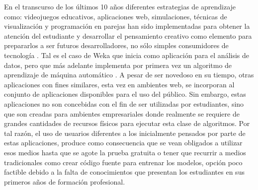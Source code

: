 En el transcurso de los últimos 10 años diferentes estrategias de aprendizaje como: videojuegos educativos, aplicaciones web, simulaciones, técnicas de visualización y programación en parejas han sido implementadas para obtener la atención del estudiante y desarrollar el pensamiento creativo como elemento para prepararlos a ser futuros desarrolladores, no sólo simples consumidores de tecnología \parencite{Salleh2013}. Tal es el caso de Weka \parencite{Hall2009} que inicia como aplicación para el análisis de datos, pero que más adelante implementa por primera vez un algoritmo de aprendizaje de máquina automático \parencite{Thornton2013}. A pesar de ser novedoso en su tiempo, otras aplicaciones con fines similares, esta vez en ambientes web, se incorporan al conjunto de aplicaciones disponibles para el uso del público. Sin embargo, estas aplicaciones no son concebidas con el fin de ser utilizadas por estudiantes, sino que son creadas para ambientes empresariales donde realmente se requiere de grandes cantidades de recursos físicos para ejecutar esta clase de algoritmos. Por tal razón, el uso de usuarios diferentes a los inicialmente pensados por parte de estas aplicaciones, produce como consecuencia que se vean obligados a utilizar esos medios hasta que se agote la prueba gratuita o tener que recurrir a medios tradicionales como crear código fuente para entrenar los modelos, opción poco factible debido a la falta de conocimientos que presentan los estudiantes en sus primeros años de formación profesional.

